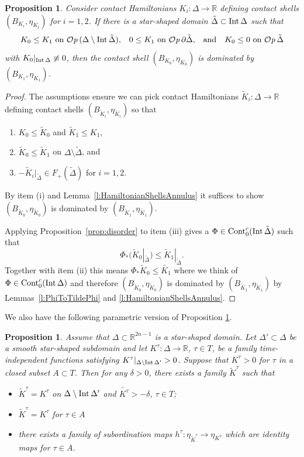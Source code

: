 \documentclass[12pt]{paper}
\theoremstyle{plain}
\newtheorem{prop}[theorem]{Proposition}
\theoremstyle{definition}
\newcommand{\wt}{\widetilde}
\newcommand{\R}{{\mathbb{R}}}
\newcommand{\Int}{{\rm Int\,}} %
\newcommand{\CCont}{\mathrm{Cont}}
\def\Op{{\mathcal O}{\it p}\,}
\numberwithin{figure}{section}
\begin{document}
\begin{prop}\label{prop:shallow}
Consider contact Hamiltonians $K_i: \Delta \to\R$ defining contact shells $(B_{K_i}, \eta_{K_i})$ for $i=1,2$.
If there is a star-shaped domain $\tilde\Delta \subset \Int \Delta$ such that
$$
	K_0 \leq K_1 \mbox{ on $\Op(\Delta \setminus \Int \tilde\Delta)$,} \quad
	0 \leq K_1 \mbox{ on $\Op \partial \tilde\Delta$,} \quad \mbox{and}\quad
	K_0 \leq 0 \mbox{ on $\Op \tilde\Delta$}
$$
with $K_0|_{\Int \Delta} \not\equiv 0$,
then the contact shell $(B_{K_0}, \eta_{K_0})$ is dominated by 	$(B_{K_1}, \eta_{K_1})$.  
\end{prop}
\begin{proof} 
The assumptions ensure we can pick contact Hamiltonians $\tilde{K}_i: \Delta \to \R$ defining contact shells $(B_{\tilde{K}_i}, \eta_{\tilde{K}_i})$ so that
\begin{enumerate}
\item $K_0 \leq \tilde{K}_0$ and $\tilde{K}_1 \leq K_1$, 
\item $\tilde{K}_0 \leq \tilde{K}_1$ on $\Delta \setminus \tilde{\Delta}$, and
\item $-\tilde{K}_i|_{\tilde{\Delta}} \in F_+(\tilde{\Delta})$ for $i=1,2$.
\end{enumerate}
By item (i) and Lemma~\ref{l:HamiltonianShellsAnnulus} it suffices to show $(B_{\tilde{K}_0}, \eta_{\tilde{K}_0})$
is dominated by $(B_{\tilde{K}_1}, \eta_{\tilde{K}_1})$.

Applying Proposition~\ref{prop:disorder} to item (iii) gives a $\Phi \in \CCont_0^c(\Int \tilde{\Delta})$ such that
$$
	\Phi_*(\tilde{K}_0|_{\tilde{\Delta}}) \leq \tilde{K}_1|_{\tilde{\Delta}}.
$$
Together with item (ii) this means $\Phi_*\tilde{K}_0 \leq \tilde{K_1}$ where we think of $\Phi \in \CCont_0^c(\Int \Delta)$ and therefore 
$(B_{\tilde{K}_0}, \eta_{\tilde{K}_0})$
is dominated by $(B_{\tilde{K}_1}, \eta_{\tilde{K}_1})$ by Lemmas~\ref{l:PhiToTildePhi} and \ref{l:HamiltonianShellsAnnulus}.
\end{proof}

 We also have the following parametric version of Proposition \ref{prop:shallow}.
 
 \begin{prop}\label{prop:shallow-param}
Assume that $\Delta \subset \R^{2n-1}$ is a star-shaped domain.  	Let $\Delta' \subset \Delta$ be a smooth star-shaped subdomain  and let $K^\tau: \Delta \to \R$, $\tau\in T$,  be a family  time-independent functions satisfying
	$K^\tau|_{\Delta \setminus \Int \Delta'} > 0$.  Suppose that  $K^\tau>0$ for $\tau$ in a closed subset $A\subset T$.
	 Then for any $\delta > 0$, there exists a family  $\wt K^\tau$ such that
	 \begin{itemize}
	 \item $\wt K^\tau=K^\tau$ on 
	 $\Delta \setminus \Int \Delta'$ and  $\wt{K^\tau} > -\delta$,  $\tau\in T$;
	 \item $\wt K^\tau= K^\tau$ for $\tau\in  A$
\item there exists a family of subordination maps $h^\tau: \eta_{{\wt K}^\tau}\to \eta_{ {K^\tau}}$
which are identity maps 	for $\tau\in A$.
\end{itemize} 
\end{prop}
\end{document}
